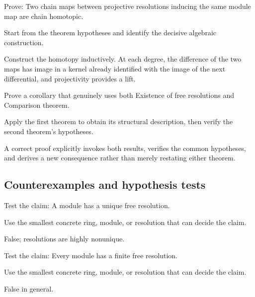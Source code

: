 \begin{exercise}\label{exr:v23-expand-08}
Prove: Two chain maps between projective resolutions inducing the same module map are chain homotopic.
\end{exercise}
\begin{hint}
Start from the theorem hypotheses and identify the decisive algebraic construction.
\end{hint}
\begin{solution}
Construct the homotopy inductively. At each degree, the difference of the two maps has image in a kernel already identified with the image of the next differential, and projectivity provides a lift.
\end{solution}

\begin{exercise}\label{exr:v23-expand-09}
Prove a corollary that genuinely uses both Existence of free resolutions and Comparison theorem.
\end{exercise}
\begin{hint}
Apply the first theorem to obtain its structural description, then verify the second theorem's hypotheses.
\end{hint}
\begin{solution}
A correct proof explicitly invokes both results, verifies the common hypotheses, and derives a new consequence rather than merely restating either theorem.
\end{solution}

\subsection*{Counterexamples and hypothesis tests}

\begin{exercise}\label{exr:v23-expand-10}
Test the claim: A module has a unique free resolution.
\end{exercise}
\begin{hint}
Use the smallest concrete ring, module, or resolution that can decide the claim.
\end{hint}
\begin{solution}
False; resolutions are highly nonunique.
\end{solution}

\begin{exercise}\label{exr:v23-expand-11}
Test the claim: Every module has a finite free resolution.
\end{exercise}
\begin{hint}
Use the smallest concrete ring, module, or resolution that can decide the claim.
\end{hint}
\begin{solution}
False in general.
\end{solution}

